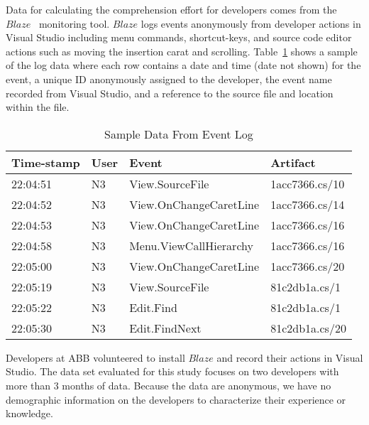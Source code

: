 
Data for calculating the comprehension effort for developers comes from the $Blaze$~\cite{Snipes2014Experiences} monitoring tool.  $Blaze$ logs events anonymously from developer actions in Visual Studio including menu commands, shortcut-keys, and source code editor actions such as moving the insertion carat and scrolling.  Table~\ref{fig:SampleEventData} shows a sample of the log data where each row contains a date and time (date not shown) for the event, a unique ID anonymously assigned to the developer, the event name recorded from Visual Studio, and a reference to the source file and location within the file.

\begin{table}
	\centering
	\caption{Sample Data From Event Log}
	\begin{tabular}{|l|l|l|l|}
	\hline

Time-stamp & User & Event & Artifact \\
\hline\hline
22:04:51 & N3 & View.SourceFile & 1acc7366.cs/10 \\
\hline
22:04:52 & N3 & View.OnChangeCaretLine & 1acc7366.cs/14 \\
\hline
22:04:53 & N3 & View.OnChangeCaretLine & 1acc7366.cs/16 \\
\hline
22:04:58 & N3 & Menu.ViewCallHierarchy & 1acc7366.cs/16 \\
\hline
22:05:00 & N3 & View.OnChangeCaretLine & 1acc7366.cs/20 \\
\hline
22:05:19 & N3 & View.SourceFile & 81c2db1a.cs/1 \\
\hline
22:05:22 & N3 & Edit.Find & 81c2db1a.cs/1 \\
\hline
22:05:30 & N3 & Edit.FindNext & 81c2db1a.cs/20 \\
\hline

	\end{tabular}
	\label{fig:SampleEventData}
\end{table}

Developers at ABB volunteered to install $Blaze$ and record their actions in Visual Studio.  The data set evaluated for this study focuses on two developers with more than 3 months of data.  Because the data are anonymous, we have no demographic information on the developers to characterize their experience or knowledge.